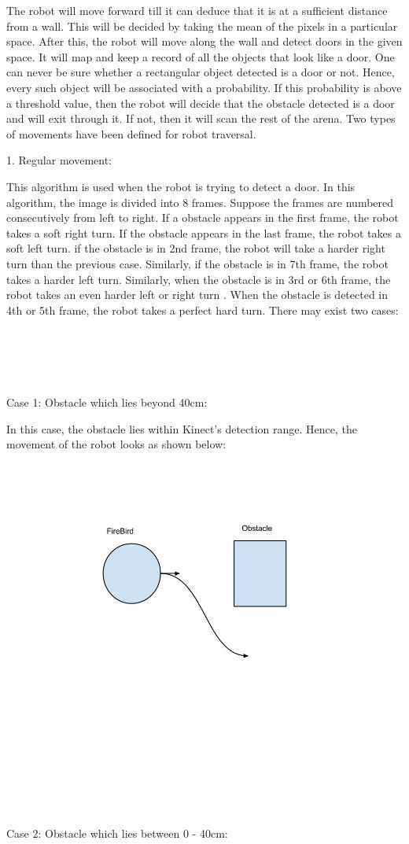 \documentclass{report}
\begin{document}
The robot will move forward till it can deduce that it is at a sufficient distance from a wall. 
This will be decided by taking the mean of the pixels in a particular space. After this, the robot
will move along the wall and detect doors in the given space. It will map and keep a record of all the objects that look 
like a door. One can never be sure whether a rectangular object detected is a door or not. Hence, 
every such object will be associated with a probability. If this probability is above a threshold 
value, then the robot will decide that the obstacle detected is a door and will exit through it. 
If not, then it will scan the rest of the arena.
Two types of movements have been defined for robot traversal.

1. Regular movement:

This algorithm is used when the robot is trying to detect a door. In this algorithm, 
the image is divided into 8 frames. Suppose the frames are numbered consecutively from left to right. 
If a obstacle appears in the first frame, the robot takes a soft right turn. If the obstacle appears in the last frame, the robot takes
a soft left turn. if the obstacle is in 2nd frame, the robot will take a harder right turn than the previous case. Similarly, if the
obstacle is in 7th frame, the robot takes a harder left turn. Similarly, when the obstacle is in 3rd or 6th frame, the robot takes an
even harder left or right turn . When the obstacle is detected in 4th or 5th frame, the robot takes a perfect hard turn. There may exist two cases:
\\ \\ \\ \\ \\ \\
Case 1: Obstacle which lies beyond 40cm:

In this case, the obstacle lies within Kinect's detection range. Hence, the movement of the robot looks as shown below:

\includegraphics[width = 20CM]{Case_1.jpg}
\\ \\ \\ \\ \\
Case 2: Obstacle which lies between 0 - 40cm:
\end{document}
